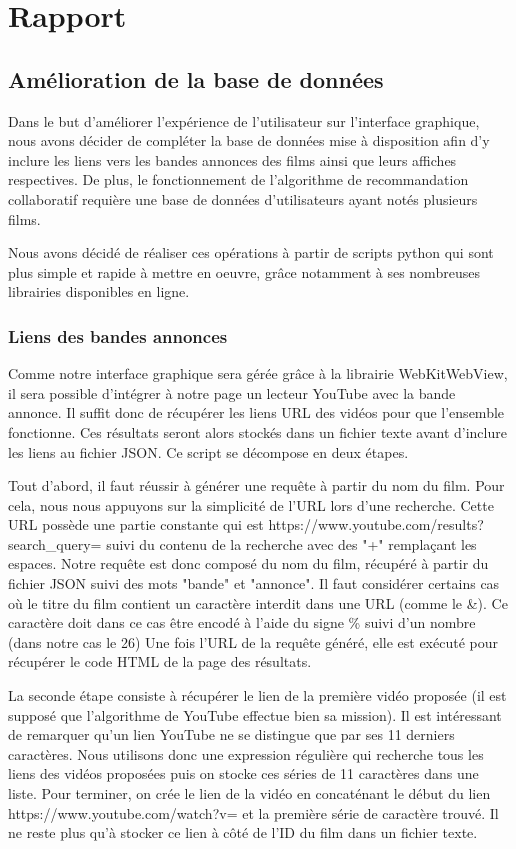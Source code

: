 \documentclass{report}
\begin{document}
\chapter{Rapport}

\section{Amélioration de la base de données}
Dans le but d'améliorer l'expérience de l'utilisateur sur l'interface graphique, nous avons décider de compléter la base de données mise à disposition afin d'y inclure les liens vers les bandes annonces des films ainsi que leurs affiches respectives.
De plus, le fonctionnement de l'algorithme de recommandation collaboratif requière une base de données d'utilisateurs ayant notés plusieurs films.
\par Nous avons décidé de réaliser ces opérations à partir de scripts python qui sont plus simple et rapide à mettre en oeuvre, grâce notamment à ses nombreuses librairies disponibles en ligne.

\subsection{Liens des bandes annonces}
Comme notre interface graphique sera gérée grâce à la librairie WebKitWebView, il sera possible d'intégrer à notre page un lecteur YouTube avec la bande annonce.
Il suffit donc de récupérer les liens URL des vidéos pour que l'ensemble fonctionne. Ces résultats seront alors stockés dans un fichier texte avant d'inclure les liens au fichier JSON.
\vspace{0.5cm}
Ce script se décompose en deux étapes.\par
Tout d'abord, il faut réussir à générer une requête à partir du nom du film. Pour cela, nous nous appuyons sur la simplicité de l'URL lors d'une recherche. Cette URL possède une partie constante qui est \newline https://www.youtube.com/results?search\_query=
suivi du contenu de la recherche avec des "+" remplaçant les espaces.
Notre requête est donc composé du nom du film, récupéré à partir du fichier JSON suivi des mots "bande" et "annonce". Il faut considérer certains cas où le titre du film contient un caractère interdit dans une URL (comme le \&). Ce caractère doit dans ce cas être encodé à l'aide du signe \% suivi d'un nombre (dans notre cas le 26)
Une fois l'URL de la requête généré, elle est exécuté pour récupérer le code HTML de la page des résultats.\par
La seconde étape consiste à récupérer le lien de la première vidéo proposée (il est supposé que l'algorithme de YouTube effectue bien sa mission). Il est intéressant de remarquer qu'un lien YouTube ne se distingue que par ses 11 derniers caractères. Nous utilisons donc une expression régulière qui recherche tous les liens des vidéos proposées puis on stocke ces séries de 11 caractères dans une liste.
Pour terminer, on crée le lien de la vidéo en concaténant le début du lien https://www.youtube.com/watch?v= et la première série de caractère trouvé. Il ne reste plus qu'à stocker ce lien à côté de l'ID du film dans un fichier texte.
\end{document}
